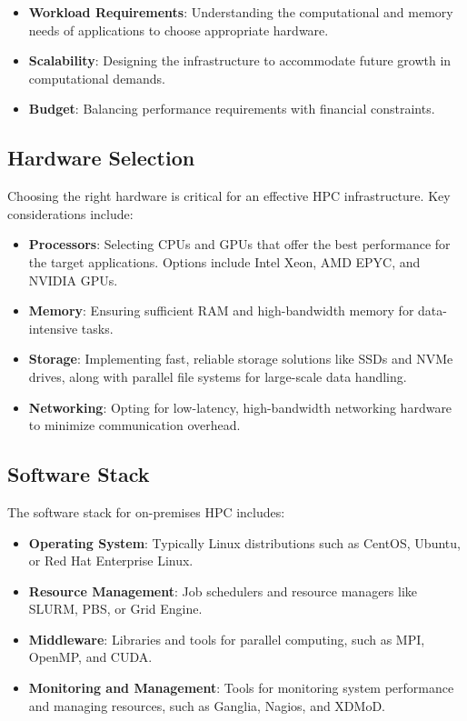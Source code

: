 \begin{itemize}
    \item \textbf{Workload Requirements}: Understanding the computational and memory needs of applications to choose appropriate hardware.
    \item \textbf{Scalability}: Designing the infrastructure to accommodate future growth in computational demands.
    \item \textbf{Budget}: Balancing performance requirements with financial constraints.
\end{itemize}

\subsection{Hardware Selection}

Choosing the right hardware is critical for an effective HPC infrastructure. Key considerations include:

\begin{itemize}
    \item \textbf{Processors}: Selecting CPUs and GPUs that offer the best performance for the target applications. Options include Intel Xeon, AMD EPYC, and NVIDIA GPUs.
    \item \textbf{Memory}: Ensuring sufficient RAM and high-bandwidth memory for data-intensive tasks.
    \item \textbf{Storage}: Implementing fast, reliable storage solutions like SSDs and NVMe drives, along with parallel file systems for large-scale data handling.
    \item \textbf{Networking}: Opting for low-latency, high-bandwidth networking hardware to minimize communication overhead.
\end{itemize}

\subsection{Software Stack}

The software stack for on-premises HPC includes:

\begin{itemize}
    \item \textbf{Operating System}: Typically Linux distributions such as CentOS, Ubuntu, or Red Hat Enterprise Linux.
    \item \textbf{Resource Management}: Job schedulers and resource managers like SLURM, PBS, or Grid Engine.
    \item \textbf{Middleware}: Libraries and tools for parallel computing, such as MPI, OpenMP, and CUDA.
    \item \textbf{Monitoring and Management}: Tools for monitoring system performance and managing resources, such as Ganglia, Nagios, and XDMoD.
\end{itemize}

